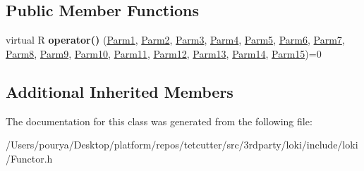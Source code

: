 \subsection*{Public Member Functions}
\begin{DoxyCompactItemize}
\item 
\hypertarget{classLoki_1_1FunctorImpl_3_01R_00_01_01_01_01_01_01_01_01_01_01_01_01_01_01_01_01_01_01_01_01_01f3c1622f2ad04de036a5a92ca27f7142_a0c74ec0e28a692d7e907e042fdbe8c0d}{}virtual R {\bfseries operator()} (\hyperlink{classLoki_1_1EmptyType}{Parm1}, \hyperlink{classLoki_1_1EmptyType}{Parm2}, \hyperlink{classLoki_1_1EmptyType}{Parm3}, \hyperlink{classLoki_1_1EmptyType}{Parm4}, \hyperlink{classLoki_1_1EmptyType}{Parm5}, \hyperlink{classLoki_1_1EmptyType}{Parm6}, \hyperlink{classLoki_1_1EmptyType}{Parm7}, \hyperlink{classLoki_1_1EmptyType}{Parm8}, \hyperlink{classLoki_1_1EmptyType}{Parm9}, \hyperlink{classLoki_1_1EmptyType}{Parm10}, \hyperlink{classLoki_1_1EmptyType}{Parm11}, \hyperlink{classLoki_1_1EmptyType}{Parm12}, \hyperlink{classLoki_1_1EmptyType}{Parm13}, \hyperlink{classLoki_1_1EmptyType}{Parm14}, \hyperlink{classLoki_1_1EmptyType}{Parm15})=0\label{classLoki_1_1FunctorImpl_3_01R_00_01_01_01_01_01_01_01_01_01_01_01_01_01_01_01_01_01_01_01_01_01f3c1622f2ad04de036a5a92ca27f7142_a0c74ec0e28a692d7e907e042fdbe8c0d}

\end{DoxyCompactItemize}
\subsection*{Additional Inherited Members}


The documentation for this class was generated from the following file\+:\begin{DoxyCompactItemize}
\item 
/\+Users/pourya/\+Desktop/platform/repos/tetcutter/src/3rdparty/loki/include/loki/Functor.\+h\end{DoxyCompactItemize}
